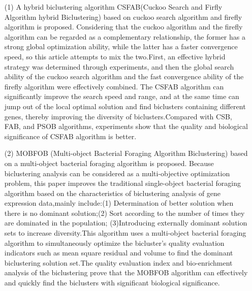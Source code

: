 \begin{eabstract}
  \begin{itemize}
    \item[(1)] {  A hybrid biclustering algorithm CSFAB(Cuckoo Search and Firfly Algorithm hybrid Biclustering) based on cuckoo search algorithm and firefly algorithm is proposed. Considering that the cuckoo algorithm and the firefly algorithm can be regarded as a complementary relationship, the former has a strong global optimization ability, while the latter has a faster convergence speed, so this article attempts to mix the two.First, an effective hybrid strategy was determined through experiments, and then the global search ability of the cuckoo search algorithm and the fast convergence ability of the firefly algorithm were effectively combined. The CSFAB algorithm can significantly improve the search speed and range, and at the same time can jump out of the local optimal solution and find biclusters containing different genes, thereby improving the diversity of biclusters.Compared with CSB, FAB, and PSOB algorithms, experiments show that the quality and biological significance of CSFAB algorithm is better.}

    \item[(2)] { MOBFOB (Multi-object Bacterial Foraging Algorithm Biclustering) based on a multi-object bacterial foraging algorithm is proposed. Because biclustering analysis can be considered as a multi-objective optimization problem, this paper improves the traditional single-object bacterial foraging algorithm based on the characteristics of biclustering analysis of gene expression data,mainly include:(1)  Determination of better solution when there is no dominant solution;(2) Sort according to the number of times they are dominated in the population; (3)Introducing externally dominant solution sets to increase diversity.This algorithm uses a multi-object bacterial foraging algorithm to simultaneously optimize the bicluster's quality evaluation indicators such as mean square residual and volume to find the dominant biclustering solution set.The quality evaluation index and bio-enrichment analysis of the biclustering prove that the MOBFOB algorithm can effectively and quickly find the biclusters with significant biological significance.}
  \end{itemize}


\end{eabstract}